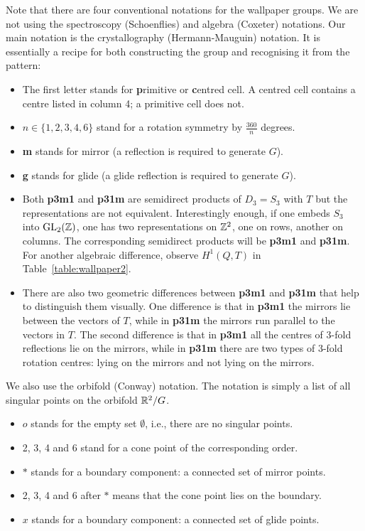 Note that there are four conventional notations for the wallpaper groups. We are not using the spectroscopy (Schoenflies) and algebra (Coxeter) notations. Our main notation is the crystallography (Hermann-Mauguin) notation. It is essentially a recipe for both constructing the group and recognising it from the pattern:
\begin{itemize}
\item The first letter stands for {\bfseries p}rimitive or {\bfseries c}entred cell. 
  A centred cell contains a centre listed in column 4; a primitive cell does not.
\item $n\in \{1,2, 3, 4,6\}$ stand for a rotation symmetry by $\frac{360}{n}$ degrees.
\item {\bfseries m} stands for mirror (a reflection is required to generate $G$).
\item {\bfseries g} stands for glide (a glide reflection is required to generate $G$).
\item Both {\bfseries p3m1} and {\bfseries p31m} are semidirect products of $D_3=S_3$ with $T$ but the representations
  are not equivalent. Interestingly enough, if one embeds $S_3$ into $\operatorname{GL}_2 ({\mathbb Z})$, one has two representations on ${\mathbb Z}^2$, one
  on rows, another on columns. The corresponding semidirect products will be {\bfseries p3m1} and {\bfseries p31m}.
  For another algebraic difference, observe
  $H^1(Q,T)$ in Table~\ref{table:wallpaper2}.
\item There are also two geometric differences between {\bfseries p3m1} and {\bfseries p31m}
that help to distinguish them visually.
One difference is that  in {\bfseries p3m1} the mirrors lie between the vectors of $T$, while
in {\bfseries p31m} the mirrors run parallel to the vectors in $T$.
The second difference is that
 in {\bfseries p3m1} all the centres of 3-fold reflections lie on the mirrors, while
 in {\bfseries p31m} there are two types of 3-fold rotation centres: lying on the mirrors and not lying on the mirrors.
\end{itemize} 

We also use the orbifold (Conway) notation. The notation is simply a list of all singular points on the orbifold ${\mathbb R}^2/G$.
\begin{itemize}
\item $o$ stands for the empty set $\emptyset$, i.e., there are no singular points.
\item 2, 3, 4 and 6 stand for a cone point of the corresponding order.
\item $*$ stands for a boundary component: a connected set of mirror points.
\item 2, 3, 4 and 6 after $*$ means that the cone point lies on the boundary.  
\item $x$ stands for a boundary component: a connected set of glide points.
\end{itemize}   

